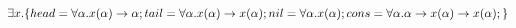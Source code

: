 \documentclass{article}
\begin{document}
$ \exists x . \{
\newline
head=\forall \alpha . x(\alpha) \rightarrow \alpha ;
\newline
tail=\forall \alpha . x(\alpha) \rightarrow x(\alpha) ;
\newline
nil=\forall \alpha . x(\alpha);
\newline
cons=\forall \alpha . \alpha \rightarrow x(\alpha) \rightarrow x(\alpha) ;
\newline
\}
$
\end{document}
